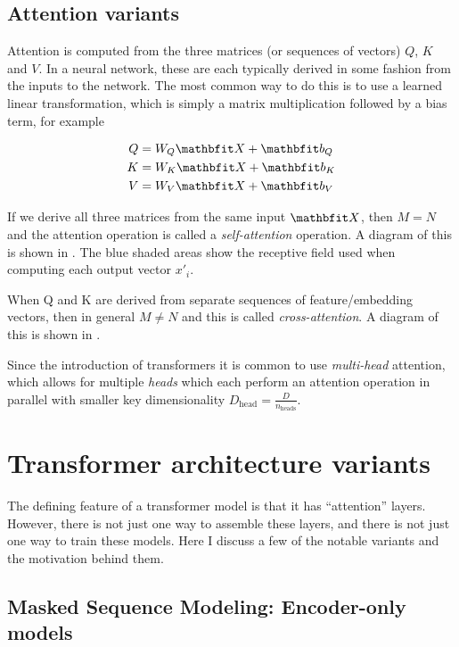 

\subsection{Attention variants}

Attention is computed from the three matrices (or sequences of vectors) $Q$, $K$ and $V$. In a neural network, these are each typically derived in some fashion from the inputs to the network. The most common way to do this is to use a learned linear transformation, which is simply a matrix multiplication followed by a bias term, for example

\begin{align}
\label{eqn:attn-linear}
Q &= W_{Q} \X + \vb_{Q} \\
K &= W_{K} \X + \vb_{K} \\
V &= W_{V} \X + \vb_{V}
\end{align}

If we derive all three matrices from the same input $\X$, then $M = N$ and the attention operation is called a \textit{self-attention} operation. A diagram of this is shown in . The blue shaded areas show the receptive field used when computing each output vector $x'_i$.

When Q and K are derived from separate sequences of feature/embedding vectors, then in general $M ≠ N$ and this is called \textit{cross-attention}. A diagram of this is shown in .



Since the introduction of transformers it is common to use \textit{multi-head} attention, which allows for multiple \textit{heads} which each perform an attention operation in parallel with smaller key dimensionality $D_{\text{head}} = \frac{D}{ n_{\text{heads}}}$.


\section{Transformer architecture variants}

The defining feature of a transformer model is that it has ``attention'' layers. However, there is not just one way to assemble these layers, and there is not just one way to train these models. Here I discuss a few of the notable variants and the motivation behind them.

\subsection{Masked Sequence Modeling: Encoder-only models}
\label{ss:msm}

